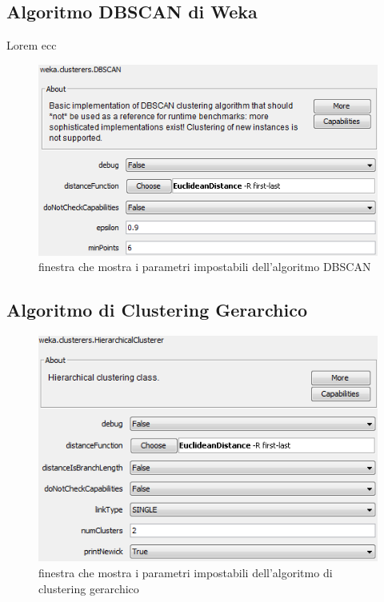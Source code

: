     \subsection{Algoritmo DBSCAN di Weka}
        Lorem ecc

        \begin{figure}
            \centering
            \caption{finestra che mostra i parametri impostabili dell'algoritmo DBSCAN}
            \label{dbscan_weka}
            \includegraphics[scale=0.50]{img/dbscan_weka.png}
        \end{figure}

    \subsection{Algoritmo di Clustering Gerarchico}

        \begin{figure}
            \centering
            \caption{finestra che mostra i parametri impostabili dell'algoritmo di clustering gerarchico}
            \label{hierar_weka}
            \includegraphics[scale=0.50]{img/hierarch_weka.png}
        \end{figure}

